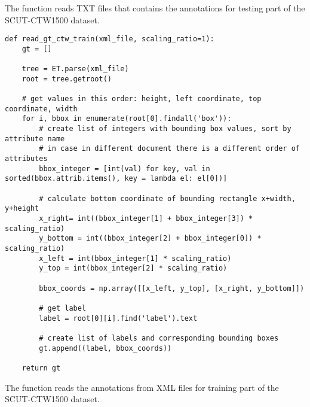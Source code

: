 The function  reads TXT files that contains the annotations for testing part of the SCUT-CTW1500 dataset.


\begin{lstlisting}[caption=read\_gt\_ctw\_train]
def read_gt_ctw_train(xml_file, scaling_ratio=1):
    gt = []

    tree = ET.parse(xml_file)
    root = tree.getroot()

    # get values in this order: height, left coordinate, top coordinate, width
    for i, bbox in enumerate(root[0].findall('box')):
        # create list of integers with bounding box values, sort by attribute name
        # in case in different document there is a different order of attributes
        bbox_integer = [int(val) for key, val in sorted(bbox.attrib.items(), key = lambda el: el[0])]
        
        # calculate bottom coordinate of bounding rectangle x+width, y+height
        x_right= int((bbox_integer[1] + bbox_integer[3]) * scaling_ratio)
        y_bottom = int((bbox_integer[2] + bbox_integer[0]) * scaling_ratio)
        x_left = int(bbox_integer[1] * scaling_ratio)
        y_top = int(bbox_integer[2] * scaling_ratio)

        bbox_coords = np.array([[x_left, y_top], [x_right, y_bottom]])

        # get label
        label = root[0][i].find('label').text

        # create list of labels and corresponding bounding boxes
        gt.append((label, bbox_coords))

    return gt
\end{lstlisting}

The function  reads the annotations from  XML files for training part of the SCUT-CTW1500 dataset.

